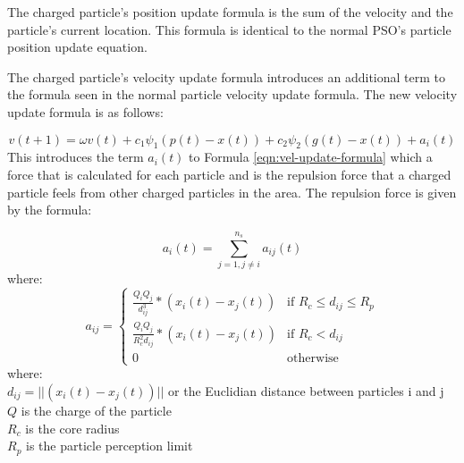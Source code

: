 The charged particle's position update formula is the sum of the velocity and the particle's current location. This formula is identical to the normal PSO's particle position update equation.

The charged particle's velocity update formula introduces an additional term to the formula seen in the normal particle velocity update formula. The new velocity update formula is as follows:

\begin{equation} \label{eqn:charged-vel-update}
 v(t+1) = \omega v(t) + c_1\psi_1 (p(t) - x(t)) + c_2 \psi_2  (g(t) - x(t)) + a_i(t)
\end{equation} This introduces the term $a_i(t)$ to Formula \ref{eqn:vel-update-formula} which a force that is calculated for each particle and is the repulsion force that a charged particle feels from other charged particles in the area. The repulsion force is given by the formula:

\begin{equation} \label{eqn:a-def}
 a_i(t) = \sum_{j=1, j\neq i}^{n_s} a_{ij}(t)
\end{equation}where:
 \begin{equation}\label{eq:a-rules}
a_{ij} = 
    \begin{cases}  
    \frac{Q_{i}Q_{j}}{d_{ij}^3} * (x_{i}(t)-x_{j}(t)) & \text{if  $R_{c} \leq d_{ij} \leq R_{p}$}\\ 
    \frac{ Q_{i}Q_{j} }{R_c^2 d_{ij}}*(x_{i}(t)-x_{j}(t)) & \text{if  $R_{c} < d_{ij}$}\\ 
    0 & \text{otherwise}
    \end{cases}
\end{equation}
where:\\
\indent $d_{ij} = ||(x_{i}(t)-x_{j}(t))||$ or the Euclidian distance between particles i and j\\
\indent $Q$ is the charge of the particle \\
\indent $R_{c}$ is the core radius \\
\indent $R_{p}$ is the particle perception limit


